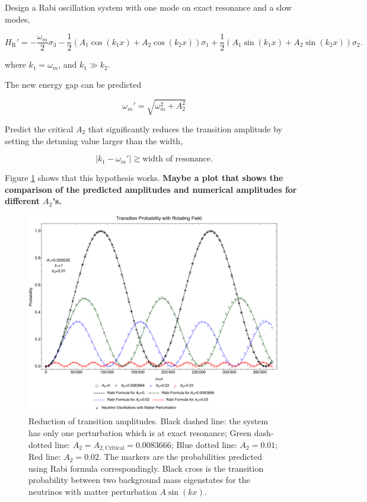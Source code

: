 \documentclass[%
preprint,
 amsmath,amssymb,
 aps,
]{revtex4-1}
\begin{document}
Design a Rabi oscillation system with one mode on exact resonance and a slow modes,

\begin{equation}
H_{\mathrm R}' = -\frac{\omega_m}{2} \sigma_3 - \frac{1}{2}( A_1 \cos(k_1 x) + A_2 \cos(k_2 x)) \sigma_1 + \frac{1}{2} ( A_1 \sin(k_1 x) + A_2 \sin(k_2 x)   ) \sigma_2.
\end{equation}

where $k_1 = \omega_m$, and $k_1 \gg k_2$.

The new energy gap can be predicted

\begin{equation}
\omega_m' = \sqrt{\omega_m^2 + A_2^2}
\end{equation}

Predict the critical $A_2$ that significantly reduces the transition amplitude by setting the detuning value larger than the width,

\begin{equation}
\lvert k_1 - \omega_m' \rvert \gtrsim \text{width of resonance}.
\end{equation}




Figure \ref{fig-rabi-oscillations-energy-gap-change} shows that this hypothesis works. {\bf Maybe a plot that shows the comparison of the predicted amplitudes and numerical amplitudes for different $A_2$'s.}


\begin{figure}[!htbp]
                \centering
                \includegraphics[width=\textwidth]{assets/rabi-oscillations-energy-gap-change-k2-0-01}
                \caption{Reduction of transition amplitudes. Black dashed line: the system has only one perturbation which is at exact resonance; Green dash-dotted line: $A_2=A_{2,\mathrm{Critical}}=0.0083666$; Blue dotted line: $A_2=0.01$; Red line: $A_2=0.02$. The markers are the probabilities predicted using Rabi formula correspondingly. Black cross is the transition probability between two background mass eigenstates for the neutrinos with matter perturbation $A\sin(kx)$.}
                \label{fig-rabi-oscillations-energy-gap-change}
\end{figure}
\end{document}

